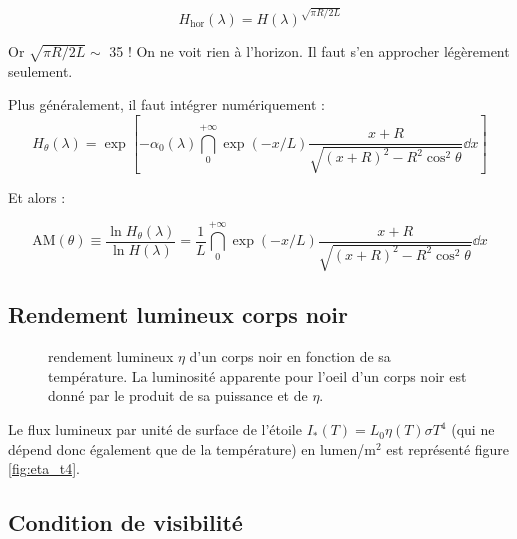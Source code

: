 \documentclass[11pt]{article} %
\begin{document}
\begin{equation}
H_{\mbox{hor}}(\lambda) = H(\lambda)^{\sqrt{\pi R/2L}}
\end{equation}

Or $\sqrt{\pi R/2L} \sim $ 35 ! On ne voit rien à l'horizon. Il faut s'en approcher légèrement seulement.

Plus généralement, il faut intégrer numériquement :
\begin{equation}
H_\theta(\lambda) = \exp \left [ -\alpha_0(\lambda) \dint_0^{+\infty}\exp(-x/L) \dfrac{x + R}{\sqrt{(x+R)^2 -  R^2\cos^2 \theta }} \dd x\right ] 
\end{equation}

Et alors :

\begin{equation}
\mbox{AM}(\theta) \equiv \dfrac{\ln H_\theta(\lambda)}{\ln H(\lambda)} = \dfrac{1}{L}\dint_0^{+\infty}\exp(-x/L) \dfrac{x + R}{\sqrt{(x+R)^2 -  R^2\cos^2 \theta }} \dd x
\end{equation}


\subsection{Rendement lumineux corps noir}

\begin{figure}[H]
\centering
  \caption{rendement lumineux $\eta$ d'un corps noir en fonction de sa température. La luminosité apparente pour l'oeil d'un corps noir est donné par le produit de sa puissance et de $\eta$. 
\label{fig:eta}}

\end{figure}

Le flux lumineux par unité de surface de l'étoile $I_*(T) = L_0 \eta(T) \sigma T^4$ (qui ne dépend donc également que de la température) en lumen/m$^2$ est représenté figure \ref{fig:eta_t4}. 

%

\subsection{Condition de visibilité}
\end{document}
